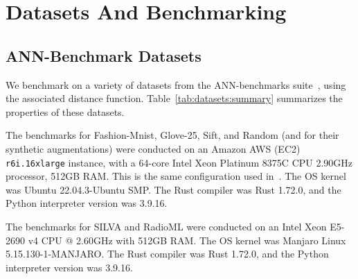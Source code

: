 \section{Datasets And Benchmarking}
\label{sec:datasets-and-benchmarks}

\subsection{ANN-Benchmark Datasets}
\label{sec:datasets-and-benchmarks:ann-benchmark-datasets}

We benchmark on a variety of datasets from the ANN-benchmarks suite~\cite{Aumller2018ANNBenchmarksAB}, using the associated distance function.
Table~\ref{tab:datasets:summary} summarizes the properties of these datasets.

The benchmarks for Fashion-Mnist, Glove-25, Sift, and Random (and for their synthetic augmentations) were conducted on an Amazon AWS (EC2) \texttt{r6i.16xlarge} instance, with a 64-core Intel Xeon Platinum 8375C CPU 2.90GHz processor, 512GB RAM.
This is the same configuration used in~\cite{Aumller2018ANNBenchmarksAB}.
The OS kernel was Ubuntu 22.04.3-Ubuntu SMP.
The Rust compiler was Rust 1.72.0, and the Python interpreter version was 3.9.16.

The benchmarks for SILVA and RadioML were conducted on an Intel Xeon E5-2690 v4 CPU @ 2.60GHz with 512GB RAM.
The OS kernel was Manjaro Linux 5.15.130-1-MANJARO.
The Rust compiler was Rust 1.72.0, and the Python interpreter version was 3.9.16.

